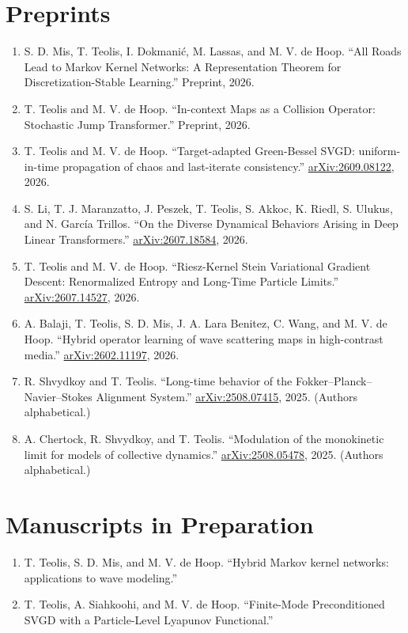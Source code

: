 \documentclass[10pt]{article}
\newcommand{\paper}[3]{#1. ``#2.'' #3}
\begin{document}
\section*{Preprints}
\begin{enumerate}
  \item \paper{S. D. Mis, T. Teolis, I. Dokmani\'c, M. Lassas, and M. V. de Hoop}{All Roads Lead to Markov Kernel Networks: A Representation Theorem for Discretization-Stable Learning}{Preprint, 2026.}
  \item \paper{T. Teolis and M. V. de Hoop}{In-context Maps as a Collision Operator: Stochastic Jump Transformer}{Preprint, 2026.}
  \item \paper{T. Teolis and M. V. de Hoop}{Target-adapted Green-Bessel SVGD: uniform-in-time propagation of chaos and last-iterate consistency}{\href{https://arxiv.org/abs/2609.08122}{arXiv:2609.08122}, 2026.}
  \item \paper{S. Li, T. J. Maranzatto, J. Peszek, T. Teolis, S. Akkoc, K. Riedl, S. Ulukus, and N. Garc\'ia Trillos}{On the Diverse Dynamical Behaviors Arising in Deep Linear Transformers}{\href{https://arxiv.org/abs/2607.18584}{arXiv:2607.18584}, 2026.}
  \item \paper{T. Teolis and M. V. de Hoop}{Riesz-Kernel Stein Variational Gradient Descent: Renormalized Entropy and Long-Time Particle Limits}{\href{https://arxiv.org/abs/2607.14527}{arXiv:2607.14527}, 2026.}
  \item \paper{A. Balaji, T. Teolis, S. D. Mis, J. A. Lara Benitez, C. Wang, and M. V. de Hoop}{Hybrid operator learning of wave scattering maps in high-contrast media}{\href{https://arxiv.org/abs/2602.11197}{arXiv:2602.11197}, 2026.}
  \item \paper{R. Shvydkoy and T. Teolis}{Long-time behavior of the Fokker--Planck--Navier--Stokes Alignment System}{\href{https://arxiv.org/abs/2508.07415}{arXiv:2508.07415}, 2025.} (Authors alphabetical.)
  \item \paper{A. Chertock, R. Shvydkoy, and T. Teolis}{Modulation of the monokinetic limit for models of collective dynamics}{\href{https://arxiv.org/abs/2508.05478}{arXiv:2508.05478}, 2025.} (Authors alphabetical.)
\end{enumerate}

\section*{Manuscripts in Preparation}
\begin{enumerate}
  \item \paper{T. Teolis, S. D. Mis, and M. V. de Hoop}{Hybrid Markov kernel networks: applications to wave modeling}{}
  \item \paper{T. Teolis, A. Siahkoohi, and M. V. de Hoop}{Finite-Mode Preconditioned SVGD with a Particle-Level Lyapunov Functional}{}
\end{enumerate}
\end{document}
